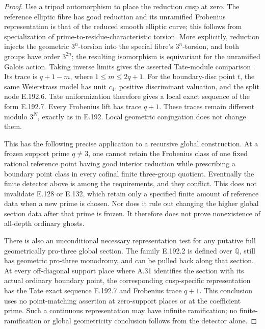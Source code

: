 \begin{proof}
Use a tripod automorphism to place the reduction cusp at zero.
The reference elliptic fibre has good reduction and its unramified
Frobenius representation is that of the reduced smooth elliptic curve;
this follows from specialization of prime-to-residue-characteristic
torsion.  More explicitly, reduction injects the geometric
\(3^n\)-torsion into the special fibre's \(3^n\)-torsion, and both
groups have order \(3^{2n}\); the resulting isomorphism is equivariant
for the unramified Galois action.  Taking inverse limits gives the
asserted Tate-module comparison
\citep[VII.3, Proposition 3.1, p.192; VII.4, Proposition 4.1,
p.195]{AuditSilverman2009}.
Its trace is \(q+1-m\), where \(1\le m\le2q+1\).
For the boundary-disc point \(t\), the same Weierstrass model has
unit \(c_4\), positive discriminant valuation, and the split node
E.192.6.  Tate uniformization therefore gives a local exact sequence
of the form E.192.7.  Every Frobenius lift has trace \(q+1\).
These traces remain different modulo \(3^N\), exactly as in E.192.
Local geometric conjugation does not change them.

This has the following precise application to a recursive global
construction.  At a frozen support prime \(q\ne3\), one cannot
retain the Frobenius class of one fixed rational reference point
having good interior reduction while prescribing a boundary point
class in every cofinal finite three-group quotient.  Eventually the
finite detector above is among the requirements, and they conflict.
This does not invalidate E.128 or E.132, which retain only a specified
finite amount of reference data when a new prime is chosen.  Nor
does it rule out changing the higher global section data after that
prime is frozen.  It therefore does not prove nonexistence of
all-depth ordinary ghosts.

There is also an unconditional necessary representation test for any
putative full geometrically pro-three global section.  The family
E.192.2 is defined over \(\mathbb Q\), still has geometric pro-three
monodromy, and can be pulled back along that section.  At every
off-diagonal support place where A.31 identifies the section with
its actual ordinary boundary point, the corresponding cusp-specific
representation has the Tate exact sequence E.192.7 and Frobenius
trace \(q+1\).  This conclusion uses no point-matching assertion
at zero-support places or at the coefficient prime.  Such a
continuous representation may have infinite ramification; no
finite-ramification or global geometricity conclusion follows from
the detector alone.
\end{proof}

